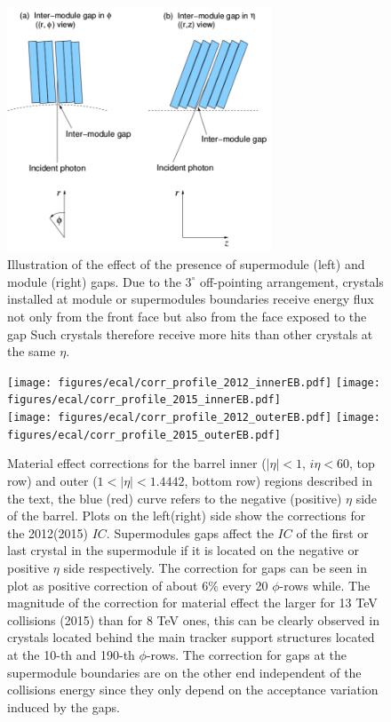 \begin{figure}[h!]
  \centering
  \includegraphics[width = 0.7\textwidth]{figures/ecal/images/Ecal_detector/SM_gap_phi_sym.png}
  \caption{Illustration of the effect of the presence of supermodule (left) and module (right) gaps.
    Due to the $3^{\circ}$ off-pointing arrangement, crystals installed at module or supermodules boundaries
    receive energy flux not only from the front face but also from the face exposed to the gap
    Such crystals therefore receive more hits than other crystals at the same $\eta$.}
  \label{fig:ecal_gaps}
\end{figure}

\begin{figure}[h!]
  \centering
  \texttt{[image: figures/ecal/corr\_profile\_2012\_innerEB.pdf]}
  \texttt{[image: figures/ecal/corr\_profile\_2015\_innerEB.pdf]}\\
  \texttt{[image: figures/ecal/corr\_profile\_2012\_outerEB.pdf]}
  \texttt{[image: figures/ecal/corr\_profile\_2015\_outerEB.pdf]}
  \caption{Material effect corrections for the barrel inner ($|\eta| < 1$, $i\eta < 60$, top row)
    and outer ($1 < |\eta| < 1.4442$, bottom row)
    regions described in the text, the blue (red) curve refers to the negative (positive) $\eta$ side of the barrel.
    Plots on the left(right) side show the corrections for the 2012(2015) $IC$.
    Supermodules gaps affect the $IC$ of the first or last crystal in the supermodule if it is located on the negative or
    positive $\eta$ side respectively. The correction for gaps can be seen in plot as positive correction of about $6\%$
    every 20 $\phi$-rows while. The magnitude of the correction for material effect the larger for 13 TeV collisions (2015)
    than for 8 TeV ones, this can be clearly observed in crystals located behind the main tracker support structures located
    at the 10-th and 190-th $\phi$-rows. The correction for gaps at the supermodule boundaries are on the other end
  independent of the collisions energy since they only depend on the acceptance variation induced by the gaps.}
  \label{fig:material_corrections}
\end{figure}

